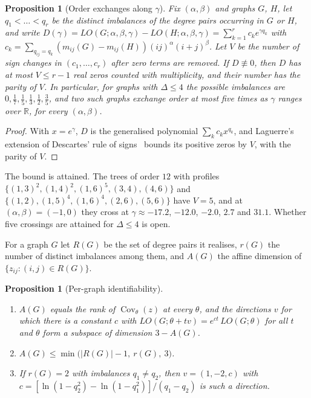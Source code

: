 \documentclass[a5paper, 10pt]{article}
\theoremstyle{plain}
\newtheorem{proposition}[theorem]{Proposition}
\theoremstyle{remark}
\theoremstyle{definition}
\begin{document}
  \begin{proposition}[Order exchanges along $\gamma$]\label{prop:laguerre}
  Fix $(\alpha,\beta)$ and graphs $G$, $H$, let
  $q_1 < \dots < q_r$ be the distinct imbalances of the degree pairs
  occurring in $G$ or $H$, and write
  $D(\gamma) = LO(G;\alpha,\beta,\gamma) - LO(H;\alpha,\beta,\gamma)
  = \sum_{k=1}^{r} c_k e^{\gamma q_k}$ with
  $c_k = \sum_{q_{ij} = q_k} (m_{ij}(G) - m_{ij}(H))(ij)^{\alpha}(i+j)^{\beta}$.
  Let $V$ be the number of sign changes in $(c_1,\dots,c_r)$ after
  zero terms are removed. If $D \not\equiv 0$, then $D$ has at most
  $V \le r - 1$ real zeros counted with multiplicity, and their number
  has the parity of $V$. In particular, for graphs with $\Delta \le 4$
  the possible imbalances are $0, \tfrac17, \tfrac15, \tfrac13,
  \tfrac12, \tfrac35$, and two such graphs exchange order at most five times as
  $\gamma$ ranges over $\mathbb{R}$, for every $(\alpha,\beta)$.
  \end{proposition}

  \begin{proof}
  With $x = e^{\gamma}$, $D$ is the generalised polynomial
  $\sum_k c_k x^{q_k}$, and Laguerre's extension of Descartes' rule of
  signs~\cite{Jameson2006} bounds its positive zeros by $V$, with the
  parity of $V$.
  \end{proof}

  The bound is attained. The trees of order $12$ with profiles
  $\{(1,3)^{2},\allowbreak (1,4)^{2},\allowbreak (1,6)^{5},\allowbreak (3,4),\allowbreak (4,6)\}$
  and
  $\{(1,2),\allowbreak (1,5)^{4},\allowbreak (1,6)^{4},\allowbreak (2,6),\allowbreak (5,6)\}$
  have $V = 5$, and at $(\alpha,\beta) = (-1,0)$ they cross at
  $\gamma \approx -17.2$, $-12.0$, $-2.0$, $2.7$ and $31.1$. Whether five
  crossings are attained for $\Delta \le 4$ is open.

  For a graph $G$ let $R(G)$ be the set of degree pairs it realises,
  $r(G)$ the number of distinct imbalances among them, and $A(G)$ the
  affine dimension of $\{z_{ij} : (i,j) \in R(G)\}$.

  \begin{proposition}[Per-graph identifiability]\label{prop:identrank}
  \begin{enumerate}
  \item[(i)] $A(G)$ equals the rank of $\operatorname{Cov}_{\theta}(z)$
  at every $\theta$, and the directions $v$ for which there is a constant
  $c$ with $LO(G;\theta + tv) = e^{ct}\,LO(G;\theta)$ for all $t$ and
  $\theta$ form a subspace of dimension $3 - A(G)$.
  \item[(ii)] $A(G) \le \min\bigl(|R(G)| - 1,\ r(G),\ 3\bigr)$.
  \item[(iii)] If $r(G) = 2$ with imbalances $q_1 \neq q_2$, then
  $v = (1, -2, c)$ with
  $c = [\ln(1 - q_2^2) - \ln(1 - q_1^2)]/(q_1 - q_2)$ is such a
  direction.
  \end{enumerate}
  \end{proposition}
\end{document}
